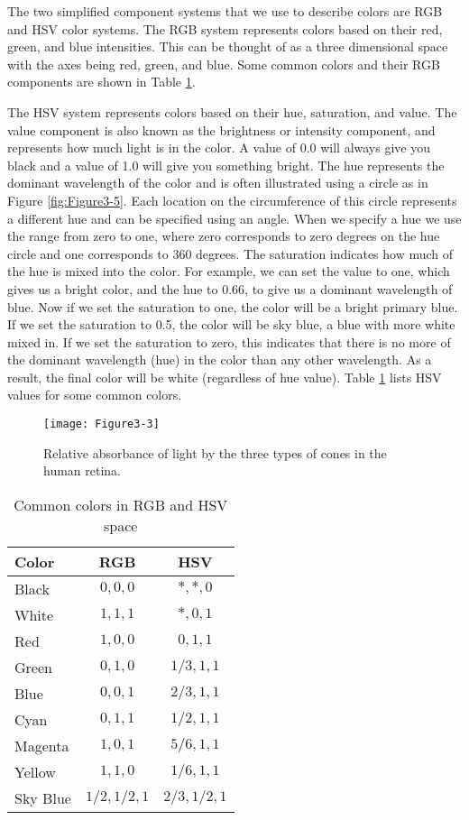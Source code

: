 The two simplified component systems that we use to describe colors are RGB and HSV color systems. The RGB system represents colors based on their red, green, and blue intensities. This can be thought of as a three dimensional space with the axes being red, green, and blue. Some common colors and their RGB components are shown in Table \ref{table:Figure3-4}.

The HSV system represents colors based on their hue, saturation, and value. The value component is also known as the brightness or intensity component, and represents how much light is in the color. A value of 0.0 will always give you black and a value of 1.0 will give you something bright. The hue represents the dominant wavelength of the color and is often illustrated using a circle as in Figure \ref{fig:Figure3-5}. Each location on the circumference of this circle represents a different hue and can be specified using an angle. When we specify a hue we use the range from zero to one, where zero corresponds to zero degrees on the hue circle and one corresponds to 360 degrees. The saturation indicates how much of the hue is mixed into the color. For example, we can set the value to one, which gives us a bright color, and the hue to 0.66, to give us a dominant wavelength of blue. Now if we set the saturation to one, the color will be a bright primary blue. If we set the saturation to 0.5, the color will be sky blue, a blue with more white mixed in. If we set the saturation to zero, this indicates that there is no more of the dominant wavelength (hue) in the color than any other wavelength. As a result, the final color will be white (regardless of hue value). Table \ref{table:Figure3-4} lists HSV values for some common colors.

\begin{figure}[!htb]
  \centering
  \texttt{[image: Figure3-3]}\\
  \caption{Relative absorbance of light by the three types of cones in the human retina.}\label{fig:Figure3-3}
\end{figure}

\begin{table}
    \centering
    \begin{tabular}{ | l | c | c | }
    \hline
    Color & RGB & HSV\\
    \hline
    Black & $0,0,0$ & $\ast,\ast,0$\\
    White & $1,1,1$ & $\ast,0,1$\\
    Red & $1,0,0$ & $0,1,1$\\
    Green & $0,1,0$ & $1/3,1,1$\\
    Blue & $0,0,1$ & $2/3,1,1$\\
    Cyan & $0,1,1$ & $1/2,1,1$\\
    Magenta & $1,0,1$ & $5/6,1,1$\\
    Yellow & $1,1,0$ & $1/6,1,1$\\
    Sky Blue & $1/2,1/2,1$ & $2/3,1/2,1$\\
    \hline
    \end{tabular}
    \caption{Common colors in RGB and HSV space}\label{table:Figure3-4}
\end{table}


